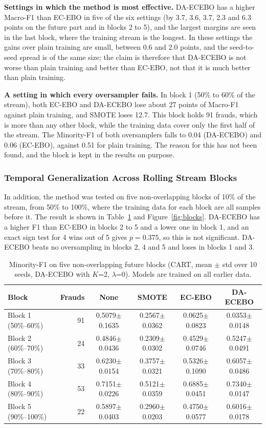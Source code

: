 \documentclass[preprint,10pt]{elsarticle}
\begin{document}
\textbf{Settings in which the method is most effective.} \quad DA-ECEBO has a higher Macro-F1 than EC-EBO in five of the six settings (by 3.7, 3.6, 3.7, 2.3 and 6.3 points on the future part and in blocks 2 to 5), and the largest margins are seen in the last block, where the training stream is the longest. In these settings the gains over plain training are small, between 0.6 and 2.0 points, and the seed-to-seed spread is of the same size; the claim is therefore that DA-ECEBO is not worse than plain training and better than EC-EBO, not that it is much better than plain training.

\textbf{A setting in which every oversampler fails.} \quad In block 1 (50\% to 60\% of the stream), both EC-EBO and DA-ECEBO lose about 27 points of Macro-F1 against plain training, and SMOTE loses 12.7. This block holds 91 frauds, which is more than any other block, while the training data cover only the first half of the stream. The Minority-F1 of both oversamplers falls to 0.04 (DA-ECEBO) and 0.06 (EC-EBO), against 0.51 for plain training. The reason for this has not been found, and the block is kept in the results on purpose.

\FloatBarrier\subsubsection{Temporal Generalization Across Rolling Stream Blocks}\label{sec:blocks_stream}\label{sec:blocks}
In addition, the method was tested on five non-overlapping blocks of 10\% of the stream, from 50\% to 100\%, where the training data for each block are all samples before it. The result is shown in Table~\ref{tab:blocks} and Figure~\ref{fig:blocks}. DA-ECEBO has a higher F1 than EC-EBO in blocks 2 to 5 and a lower one in block 1, and an exact sign test for 4 wins out of 5 gives $p=0.375$, so this is not significant. DA-ECEBO beats no oversampling in blocks 2, 4 and 5 and loses in blocks 1 and 3.

\begin{table}[!htbp]
\centering\small
\caption{Minority-F1 on five non-overlapping future blocks (CART, mean $\pm$ std over 10 seeds, DA-ECEBO with $K$=2, $\lambda$=0). Models are trained on all earlier data.}\label{tab:blocks}
\begin{tabular}{lrcccc}
\toprule
Block & Frauds & None & SMOTE & EC-EBO & DA-ECEBO\\
\midrule
Block 1 (50\%--60\%) & 91 & 0.5079$\pm$0.1635 & 0.2567$\pm$0.0362 & 0.0625$\pm$0.0823 & 0.0353$\pm$0.0148\\
Block 2 (60\%--70\%) & 24 & 0.4846$\pm$0.0436 & 0.2309$\pm$0.0302 & 0.4529$\pm$0.0746 & 0.5247$\pm$0.0491\\
Block 3 (70\%--80\%) & 33 & 0.6230$\pm$0.0154 & 0.3757$\pm$0.0321 & 0.5326$\pm$0.1090 & 0.6057$\pm$0.0486\\
Block 4 (80\%--90\%) & 53 & 0.7151$\pm$0.0226 & 0.5121$\pm$0.0359 & 0.6885$\pm$0.0451 & 0.7340$\pm$0.0147\\
Block 5 (90\%--100\%) & 22 & 0.5897$\pm$0.0403 & 0.2960$\pm$0.0203 & 0.4750$\pm$0.0577 & 0.6016$\pm$0.0178\\
\bottomrule
\end{tabular}
\end{table}
\end{document}
